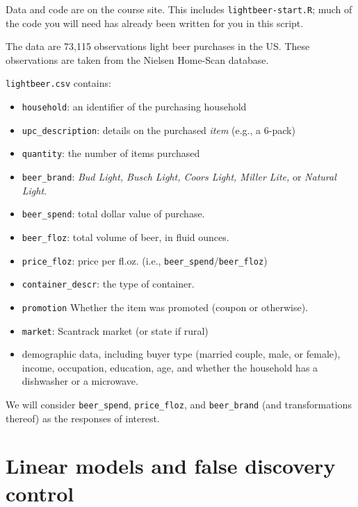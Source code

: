 \documentclass[12pt]{article}
\begin{document}
\pagestyle{empty} 


\bigskip

\noindent
Data and code are on the course site. 
	This includes {\tt lightbeer-start.R}; 
	much of the code you will need has already been written for you in this script.


\medskip\noindent
The data are 73,115 observations light beer purchases in the US. These observations are taken from the Nielsen Home-Scan database.

\bigskip\noindent
{\tt lightbeer.csv} contains:
\begin{itemize}
\item \texttt{household}: an identifier of the purchasing household
\item \texttt{upc\_description}: details on the purchased {\it item} (e.g., a 6-pack)
\item \texttt{quantity}: the number of items purchased
\item \texttt{beer\_brand}:  \textit{Bud Light, Busch Light, Coors Light, Miller Lite,} or \textit{Natural Light}.
\item \texttt{beer\_spend}:  total dollar value of purchase.
\item \texttt{beer\_floz}: total volume of beer, in fluid ounces.
\item \texttt{price\_floz}: price per fl.oz. (i.e., \texttt{beer\_spend}/\texttt{beer\_floz})
\item \texttt{container\_descr}: the type of container. 
\item \texttt{promotion} Whether the item was promoted (coupon or otherwise). 
\item \texttt{market}: Scantrack market (or state if rural)
\item demographic data, including buyer type (married couple, male, or female), income, occupation, education, age, and whether the household has a dishwasher or a microwave.
\end{itemize}
We will consider \texttt{beer\_spend}, \texttt{price\_floz}, and \texttt{beer\_brand} (and transformations thereof) as the responses of interest.


\newpage
\section{Linear models and false discovery control}
\end{document}
